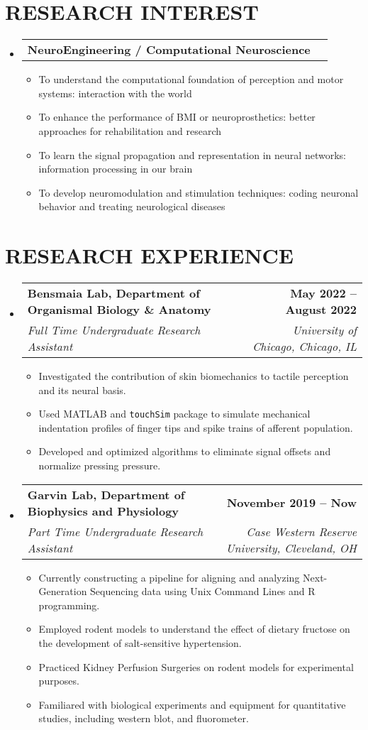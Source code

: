 \documentclass[letterpaper,11pt]{article}
\makeatletter
\newcommand{\resumeItem}[1]{
	\item\small{
		{#1 \vspace{0pt}}
	}
}
\newcommand{\resumeSubheading}[4]{
	\vspace{-2pt}\item
	\begin{tabular*}{1.0\textwidth}[t]{l@{\extracolsep{\fill}}r}
		\textbf{#1} & \textbf{\small #2} \\
		\textit{\small#3} & \textit{\small #4} \\
	\end{tabular*}\vspace{-4pt}
}
\newcommand{\resumeResearchHeading}[2]{
	\vspace{-2pt}\item
	\begin{tabular*}{1.0\textwidth}[t]{l@{\extracolsep{\fill}}r}
		\textbf{#1} & \textbf{\small #2} \\
	\end{tabular*}\vspace{-4pt}
}
\newcommand{\resumeSubHeadingListStart}{\begin{itemize}[leftmargin=0.0in, label={}]}
\newcommand{\resumeSubHeadingListEnd}{\end{itemize}}
\newcommand{\resumeItemListStart}{\begin{itemize}}
\newcommand{\resumeItemListEnd}{\end{itemize}\vspace{-5pt}}
\makeatother
\begin{document}
	\section{RESEARCH INTEREST}
	\resumeSubHeadingListStart
	\resumeResearchHeading{NeuroEngineering / Computational Neuroscience}{}
	\resumeItemListStart
	\resumeItem{To understand the computational foundation of perception and motor systems: interaction with the world}
	\resumeItem{To enhance the performance of BMI or neuroprosthetics: better approaches for rehabilitation and research }
	\resumeItem{To learn the signal propagation and representation in neural networks: information processing in our brain}
	\resumeItem{To develop neuromodulation and stimulation techniques: coding neuronal behavior and treating neurological diseases}
	\resumeItemListEnd
	\resumeSubHeadingListEnd      
	
	\section{RESEARCH EXPERIENCE}
	\resumeSubHeadingListStart
	\resumeSubheading
	{Bensmaia Lab, Department of Organismal Biology \& Anatomy}{May 2022 -- August 2022}
	{Full Time Undergraduate Research Assistant}{University of Chicago, Chicago, IL}
	\resumeItemListStart
	\resumeItem{Investigated the contribution of skin biomechanics to tactile perception and its neural basis. }
	\resumeItem{Used MATLAB and \texttt{touchSim} package to simulate mechanical indentation profiles of finger tips and spike trains of afferent population.}
	\resumeItem{Developed and optimized algorithms to eliminate signal offsets and normalize pressing pressure.}
	\resumeItemListEnd
	
	\resumeSubheading
	{Garvin Lab, Department of Biophysics and Physiology}{November 2019 -- Now}
	{Part Time Undergraduate Research Assistant}{Case Western Reserve University, Cleveland, OH}
	\resumeItemListStart
	\resumeItem{Currently constructing a pipeline for aligning and analyzing Next-Generation Sequencing data using Unix Command Lines and R programming.}
	\resumeItem{Employed rodent models to understand the effect of dietary fructose on the development of salt-sensitive hypertension.}
	\resumeItem{Practiced Kidney Perfusion Surgeries on rodent models for experimental purposes.}
	\resumeItem{Familiared with biological experiments and equipment for quantitative studies, including western blot, and fluorometer.}
	\resumeItemListEnd
	\resumeSubHeadingListEnd
\end{document}
